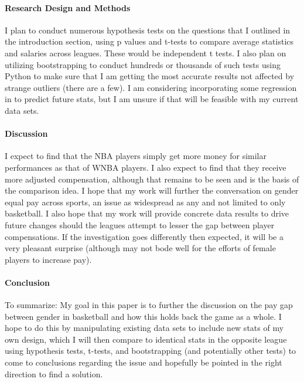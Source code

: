 \documentclass[12pt]{article}
\begin{document}
\paragraph{Research Design and Methods}
I plan to conduct numerous hypothesis tests on the questions that I outlined in the introduction 
section, using p values and t-tests to compare average statistics and salaries across leagues. 
These would be independent t tests. I also plan on utilizing bootstrapping to conduct hundreds 
or thousands of such tests using Python to make sure that I am getting the most accurate results 
not affected by strange outliers (there are a few). I am considering incorporating some regression 
in to predict future stats, but I am unsure if that will be feasible with my current data sets.

\paragraph{Discussion}
I expect to find that the NBA players simply get more money for similar performances as that of WNBA 
players. I also expect to find that they receive more adjusted compensation, although that remains to 
be seen and is the basis of the comparison idea. I hope that my work will further the conversation on 
gender equal pay across sports, an issue as widespread as any and not limited to only basketball. 
I also hope that my work will provide concrete data results to drive future changes should the leagues 
attempt to lesser the gap between player compensations. If the investigation goes differently then 
expected, it will be a very pleasant surprise (although may not bode well for the efforts of female 
players to increase pay).

\paragraph{Conclusion}
To summarize: My goal in this paper is to further the discussion on the pay gap between gender 
in basketball and how this holds back the game as a whole. I hope to do this by manipulating 
existing data sets to include new stats of my own design, which I will then compare to identical 
stats in the opposite league using hypothesis tests, t-tests, and bootstrapping (and potentially 
other tests) to come to conclusions regarding the issue and hopefully be pointed in the right 
direction to find a solution.




\end{document}

